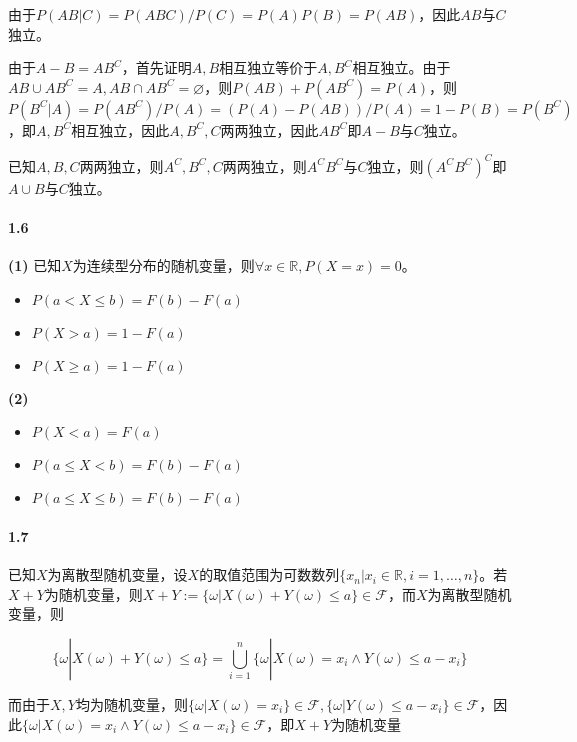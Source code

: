 \documentclass{article}
\begin{document}
    由于$P(AB|C) = P(ABC) / P(C) = P(A)P(B) = P(AB)$，因此$AB$与$C$独立。

    由于$A - B = AB^C$，首先证明$A, B$相互独立等价于$A, B^C$相互独立。由于$AB\cup AB^C = A, AB\cap AB^C = \varnothing$，则$P(AB) + P(AB^C) = P(A)$，则$P(B^C | A) = P(AB^C) / P(A) = (P(A) - P(AB)) / P(A) = 1 - P(B) = P(B^C)$，即$A, B^C$相互独立，因此$A, B^C, C$两两独立，因此$AB^C$即$A-B$与$C$独立。

    已知$A, B, C$两两独立，则$A^C, B^C, C$两两独立，则$A^CB^C$与$C$独立，则$(A^CB^C)^C$即$A\cup B$与$C$独立。

    \paragraph*{1.6} \textbf{(1)} 已知$X$为连续型分布的随机变量，则$\forall x\in \mathbb R, P(X=x) = 0$。

    \begin{itemize}
        \item $P(a < X \leqslant b) = F(b) - F(a)$
        \item $P(X > a) = 1 - F(a)$
        \item $P(X \geqslant a) = 1 - F(a)$
    \end{itemize}

    \textbf{(2)} 

    \begin{itemize}
        \item $P(X < a) = F(a)$
        \item $P(a\leqslant X < b) = F(b) - F(a)$
        \item $P(a\leqslant X \leqslant b) = F(b) - F(a)$
    \end{itemize}

    \paragraph*{1.7}

    已知$X$为离散型随机变量，设$X$的取值范围为可数数列$\{x_n| x_i\in\mathbb R, i=1, \dots, n\}$。若$X+Y$为随机变量，则$X + Y:=\{\omega | X(\omega) + Y(\omega) \leqslant a\}\in \mathcal F$，而$X$为离散型随机变量，则

    \begin{equation}
        \{\omega | X(\omega) + Y(\omega) \leqslant a\} = \bigcup_{i=1}^n\{\omega | X(\omega) = x_i \land Y(\omega) \leqslant a - x_i\}
    \end{equation}

    而由于$X, Y$均为随机变量，则$\{\omega | X(\omega) = x_i\}\in \mathcal F, \{\omega | Y(\omega) \leqslant a - x_i\}\in \mathcal F$，因此$\{\omega | X(\omega) = x_i \land Y(\omega) \leqslant a - x_i\} \in \mathcal F$，即$X + Y$为随机变量
\end{document}
